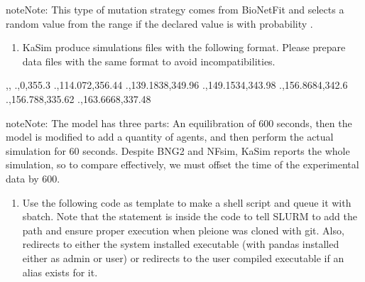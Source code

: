 \documentclass[letterpaper,10pt,english]{sphinxmanual}
\begin{document}
\begin{sphinxadmonition}{note}{Note:}
 This type of mutation strategy comes from BioNetFit and
selects a random value from the range 
if the declared value is  with probability .
\end{sphinxadmonition}
\begin{enumerate}
\def\theenumi{\arabic{enumi}}
\def\labelenumi{\theenumi .}
\makeatletter\def\p@enumii{\p@enumi \theenumi .}\makeatother
\setcounter{enumi}{1}
\item {} 

KaSim produce simulations files with the following format. Please prepare
data files with the same format to avoid incompatibilities.

\end{enumerate}

%
\begin{sphinxVerbatim}[commandchars=\\\{\}]
,,
.,0,355.3
.,114.072,356.44
.,139.1838,349.96
.,149.1534,343.98
.,156.8684,342.6
.,156.788,335.62
.,163.6668,337.48
\end{sphinxVerbatim}

\begin{sphinxadmonition}{note}{Note:}
 The model has three parts: An equilibration of
600 seconds, then the model is modified to add a quantity of  agents,
and then perform the actual simulation for 60 seconds. Despite BNG2 and NFsim,
KaSim reports the whole simulation, so to compare effectively, we must offset
the time of the experimental data by 600.
\end{sphinxadmonition}
\begin{enumerate}
\def\theenumi{\arabic{enumi}}
\def\labelenumi{\theenumi .}
\makeatletter\def\p@enumii{\p@enumi \theenumi .}\makeatother
\setcounter{enumi}{1}
\item {} 

Use the following code as template to make a shell script and queue it with
sbatch. Note that the  statement is inside the code to tell SLURM
to add the path and ensure proper execution when pleione was cloned with
git. Also,  redirects to either the system installed executable
(with pandas installed either as admin or user) or redirects to the user
compiled executable if an alias exists for it.

\end{enumerate}
\end{document}
